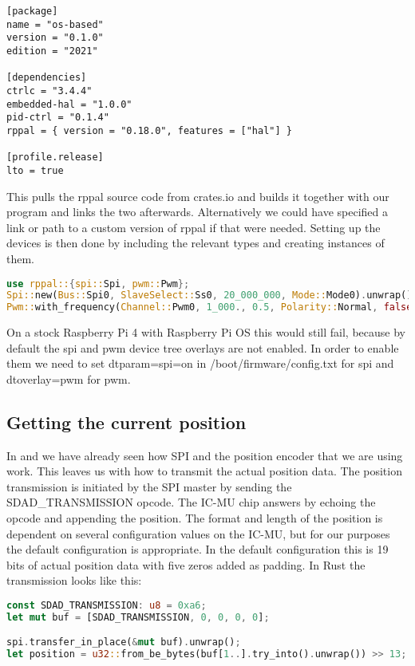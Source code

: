 \begin{verbatim}
[package]
name = "os-based"
version = "0.1.0"
edition = "2021"

[dependencies]
ctrlc = "3.4.4"
embedded-hal = "1.0.0"
pid-ctrl = "0.1.4"
rppal = { version = "0.18.0", features = ["hal"] }

[profile.release]
lto = true
\end{verbatim}

This pulls the rppal source code from crates.io and builds it together with our program and links the two afterwards.
Alternatively we could have specified a link or path to a custom version of rppal if that were needed.
Setting up the devices is then done by including the relevant types and creating instances of them.

\begin{lstlisting}[language=Rust,style=colouredRust]
use rppal::{spi::Spi, pwm::Pwm};
Spi::new(Bus::Spi0, SlaveSelect::Ss0, 20_000_000, Mode::Mode0).unwrap();
Pwm::with_frequency(Channel::Pwm0, 1_000., 0.5, Polarity::Normal, false).unwrap();
\end{lstlisting}

On a stock Raspberry Pi 4 with Raspberry Pi OS this would still fail, because by default the spi and pwm device tree overlays are not enabled.
In order to enable them we need to set dtparam=spi=on in /boot/firmware/config.txt for spi and dtoverlay=pwm for pwm.

\subsection{Getting the current position}

In  and  we have already seen how SPI and the position encoder that we are using work.
This leaves us with how to transmit the actual position data.
The position transmission is initiated by the SPI master by sending the SDAD\_TRANSMISSION opcode.
The IC-MU chip answers by echoing the opcode and appending the position.
The format and length of the position is dependent on several configuration values on the IC-MU, but for our purposes the default configuration is appropriate.
In the default configuration this is 19 bits of actual position data with five zeros added as padding.
In Rust the transmission looks like this:

\begin{lstlisting}[language=Rust,style=colouredRust]
const SDAD_TRANSMISSION: u8 = 0xa6;
let mut buf = [SDAD_TRANSMISSION, 0, 0, 0, 0];

spi.transfer_in_place(&mut buf).unwrap();
let position = u32::from_be_bytes(buf[1..].try_into().unwrap()) >> 13;
\end{lstlisting}

